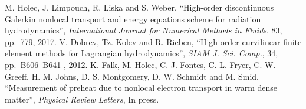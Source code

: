\documentclass[11pt,a4paper]{article}
\begin{document}
%
%

\begin{thebibliography}{10}

 M. Holec, J. Limpouch, R. Liska and S. Weber,
``High-order discontinuous Galerkin nonlocal transport and energy equations 
scheme for radiation hydrodynamics'',
\textit{International Journal for Numerical Methods in Fluids}, 83, pp.~779, 2017.
 V. Dobrev, Tz. Kolev and R. Rieben,
``High-order curvilinear finite element methods for Lagrangian
hydrodynamics'',
\textit{SIAM J. Sci. Comp.}, 34, pp.~B606--B641 , 2012.
 K. Falk, M. Holec, C. J. Fontes, C. L. Fryer, C. W. Greeff, 
H. M. Johns, D. S. Montgomery, D. W. Schmidt and M. Smid,
``Measurement of preheat due to nonlocal electron transport in warm dense 
matter'',
\textit{Physical Review Letters}, In press.
\end{thebibliography}

%
%
\end{document}
